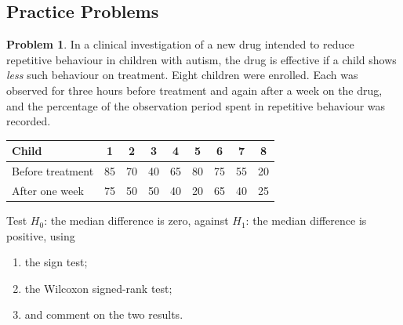 \documentclass[11pt,a4paper]{article}
\theoremstyle{definition}
\newtheorem{problemx}{Problem}[section]
\newenvironment{problem}{\begin{problemx}}{\end{problemx}}
\begin{document}
\subsection{Practice Problems}

\begin{problem}
In a clinical investigation of a new drug intended to reduce repetitive behaviour
in children with autism, the drug is effective if a child shows \emph{less} such
behaviour on treatment. Eight children were enrolled. Each was observed for three
hours before treatment and again after a week on the drug, and the percentage of
the observation period spent in repetitive behaviour was recorded.

\begin{table}[H]
\centering
\begin{tabular}{l|cccccccc}
Child &1&2&3&4&5&6&7&8\\
\hline
Before treatment &85&70&40&65&80&75&55&20\\
After one week &75&50&50&40&20&65&40&25\\
\end{tabular}
\end{table}

Test $H_0$: the median difference is zero, against $H_1$: the median difference is
positive, using
\begin{enumerate}
\item[(a).] the sign test;
\item[(b).] the Wilcoxon signed-rank test;
\item[(c).] and comment on the two results.
\end{enumerate}
\end{problem}
\end{document}
